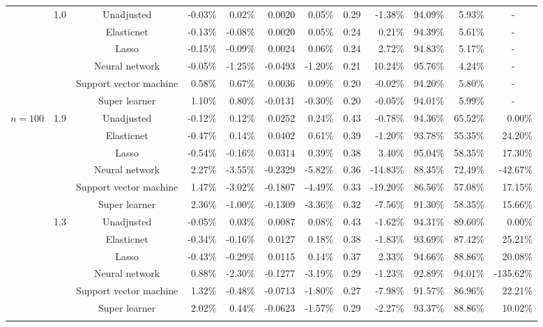 \documentclass{article}
\begin{document}
\begin{center}
\begin{table}[!ht]
\begin{tabular*}{\textwidth}{@{\extracolsep\fill}c|c|c|rrrr|rrrrr}
        ~ & \multirow{6}{*}{1.0} & Unadjusted & -0.03\% & 0.02\% & 0.0020 & 0.05\% & 0.29 & -1.38\% & 94.09\% & 5.93\% & \multicolumn{1}{c}{-} \\ 
        ~ & ~ & Elasticnet & -0.13\% & -0.08\% & 0.0020 & 0.05\% & 0.24 & 0.21\% & 94.39\% & 5.61\% & \multicolumn{1}{c}{-} \\ 
        ~ & ~ & Lasso & -0.15\% & -0.09\% & 0.0024 & 0.06\% & 0.24 & 2.72\% & 94.83\% & 5.17\% & \multicolumn{1}{c}{-} \\ 
        ~ & ~ & Neural network & -0.05\% & -1.25\% & -0.0493 & -1.20\% & 0.21 & 10.24\% & 95.76\% & 4.24\% & \multicolumn{1}{c}{-} \\ 
        ~ & ~ & Support vector machine & 0.58\% & 0.67\% & 0.0036 & 0.09\% & 0.20 & -0.02\% & 94.20\% & 5.80\% & \multicolumn{1}{c}{-} \\ 
        ~ & ~ & Super learner & 1.10\% & 0.80\% & -0.0131 & -0.30\% & 0.20 & -0.05\% & 94.01\% & 5.99\% & \multicolumn{1}{c}{-} \\      \hline
        
        
         \multirow{18}{*}{$n = 100$} & \multirow{6}{*}{1.9} & Unadjusted & -0.12\% & 0.12\% & 0.0252 & 0.24\% & 0.43 & -0.78\% & 94.36\% & 65.52\% & 0.00\% \\
        ~ & ~ & Elasticnet & -0.47\% & 0.14\% & 0.0402 & 0.61\% & 0.39 & -1.20\% & 93.78\% & 55.35\% & 24.20\% \\
        ~ & ~ & Lasso & -0.54\% & -0.16\% & 0.0314 & 0.39\% & 0.38 & 3.40\% & 95.04\% & 58.35\% & 17.30\% \\ 
        ~ & ~ & Neural network & 2.27\% & -3.55\% & -0.2329 & -5.82\% & 0.36 & -14.83\% & 88.35\% & 72.49\% & -42.67\% \\
        ~ & ~ & Support vector machine & 1.47\% & -3.02\% & -0.1807 & -4.49\% & 0.33 & -19.20\% & 86.56\% & 57.08\% & 17.15\% \\
        ~ & ~ & Super learner & 2.36\% & -1.00\% & -0.1309 & -3.36\% & 0.32 & -7.56\% & 91.30\% & 58.35\% & 15.66\% \\  \cline{2-12}
        
        ~ & \multirow{6}{*}{1.3} & Unadjusted & -0.05\% & 0.03\% & 0.0087 & 0.08\% & 0.43 & -1.62\% & 94.31\% & 89.60\% & 0.00\% \\ 
        ~ & ~ & Elasticnet & -0.34\% & -0.16\% & 0.0127 & 0.18\% & 0.38 & -1.83\% & 93.69\% & 87.42\% & 25.21\% \\ 
        ~ & ~ & Lasso & -0.43\% & -0.29\% & 0.0115 & 0.14\% & 0.37 & 2.33\% & 94.66\% & 88.86\% & 20.08\% \\ 
        ~ & ~ & Neural network & 0.88\% & -2.30\% & -0.1277 & -3.19\% & 0.29 & -1.23\% & 92.89\% & 94.01\% & -135.62\% \\ 
        ~ & ~ & Support vector machine & 1.32\% & -0.48\% & -0.0713 & -1.80\% & 0.27 & -7.98\% & 91.57\% & 86.96\% & 22.21\% \\ 
        ~ & ~ & Super learner & 2.02\% & 0.44\% & -0.0623 & -1.57\% & 0.29 & -2.27\% & 93.37\% & 88.86\% & 10.02\% \\ \cline{2-12}
        

\end{tabular*}
\end{table}
\end{center}
\end{document}
